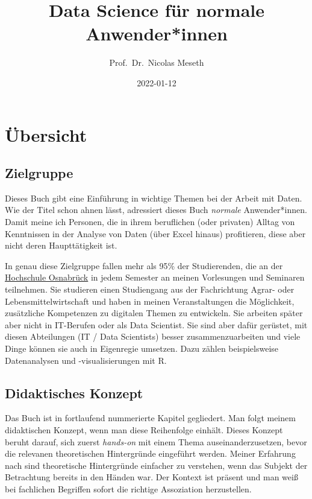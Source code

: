 \documentclass[
]{book}
\title{Data Science für normale Anwender*innen}
\author{Prof.~Dr.~Nicolas Meseth}
\date{2022-01-12}
\begin{document}
\maketitle

{
\setcounter{tocdepth}{1}
\tableofcontents
}
\hypertarget{uxfcbersicht}{%
\chapter*{Übersicht}\label{uxfcbersicht}}

\hypertarget{zielgruppe}{%
\section*{Zielgruppe}\label{zielgruppe}}

Dieses Buch gibt eine Einführung in wichtige Themen bei der Arbeit mit Daten. Wie der Titel schon ahnen lässt, adressiert dieses Buch \emph{normale} Anwender*innen. Damit meine ich Personen, die in ihrem beruflichen (oder privaten) Alltag von Kenntnissen in der Analyse von Daten (über Excel hinaus) profitieren, diese aber nicht deren Haupttätigkeit ist.

In genau diese Zielgruppe fallen mehr als 95\% der Studierenden, die an der \href{https://hs-osnabrueck.de}{Hochschule Osnabrück} in jedem Semester an meinen Vorlesungen und Seminaren teilnehmen. Sie studieren einen Studiengang aus der Fachrichtung Agrar- oder Lebensmittelwirtschaft und haben in meinen Veranstaltungen die Möglichkeit, zusätzliche Kompetenzen zu digitalen Themen zu entwickeln. Sie arbeiten später aber nicht in IT-Berufen oder als Data Scientist. Sie sind aber dafür gerüstet, mit diesen Abteilungen (IT / Data Scientists) besser zusammenzuarbeiten und viele Dinge können sie auch in Eigenregie umsetzen. Dazu zählen beispielsweise Datenanalysen und -visualisierungen mit R.

\hypertarget{didaktisches-konzept}{%
\section*{Didaktisches Konzept}\label{didaktisches-konzept}}

Das Buch ist in fortlaufend nummerierte Kapitel gegliedert. Man folgt meinem didaktischen Konzept, wenn man diese Reihenfolge einhält. Dieses Konzept beruht darauf, sich zuerst \emph{hands-on} mit einem Thema auseinanderzusetzen, bevor die relevanen theoretischen Hintergründe eingeführt werden. Meiner Erfahrung nach sind theoretische Hintergründe einfacher zu verstehen, wenn das Subjekt der Betrachtung bereits in den Händen war. Der Kontext ist präsent und man weiß bei fachlichen Begriffen sofort die richtige Assoziation herzustellen.
\end{document}
